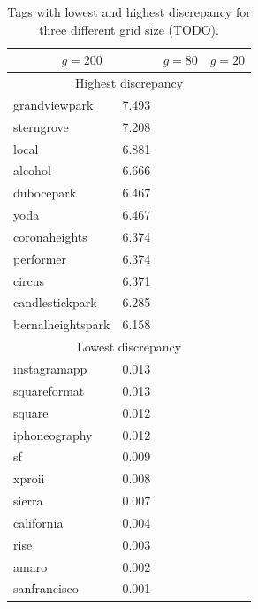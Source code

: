 \begin{table}[ht]
\centering
\setlength{\tabcolsep}{1.2em}
\begin{tabular}{lclclc}
\toprule
 \multicolumn{2}{c}{$g=200$}&  \multicolumn{2}{c}{$g=80$}&  \multicolumn{2}{c}{$g=20$}  \\
\midrule
\multicolumn{6}{c}{Highest discrepancy} \\
\midrule
grandviewpark     & 7.493 &  &  &  & \\
sterngrove        & 7.208 &  &  &  & \\
local             & 6.881 &  &  &  & \\
alcohol           & 6.666 &  &  &  & \\
dubocepark        & 6.467 &  &  &  & \\
yoda              & 6.467 &  &  &  & \\
coronaheights     & 6.374 &  &  &  & \\
performer         & 6.374 &  &  &  & \\
circus            & 6.371 &  &  &  & \\
candlestickpark   & 6.285 &  &  &  & \\
bernalheightspark & 6.158 &  &  &  & \\
\midrule
\multicolumn{6}{c}{Lowest discrepancy} \\
\midrule
instagramapp  & 0.013 &  &  &  & \\
squareformat  & 0.013 &  &  &  & \\
square        & 0.012 &  &  &  & \\
iphoneography & 0.012 &  &  &  & \\
sf            & 0.009 &  &  &  & \\
xproii        & 0.008 &  &  &  & \\
sierra        & 0.007 &  &  &  & \\
california    & 0.004 &  &  &  & \\
rise          & 0.003 &  &  &  & \\
amaro         & 0.002 &  &  &  & \\
sanfrancisco  & 0.001 &  &  &  & \\
\bottomrule
\end{tabular}
\caption{Tags with lowest and highest discrepancy for three different grid
size (TODO).\label{t:disc}}
\end{table}
